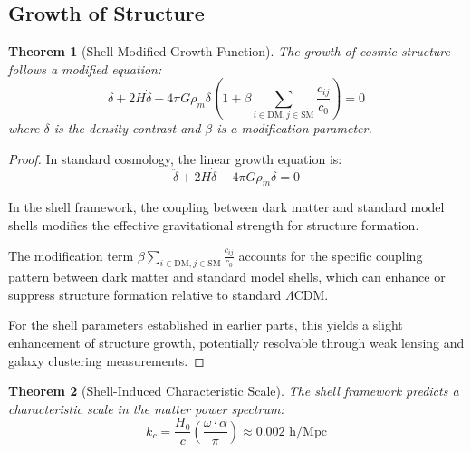 \documentclass[12pt,a4paper]{article}
\newtheorem{theorem}{Theorem}[section]
\begin{document}
\subsection{Growth of Structure}
\label{subsec:growth-structure}

\begin{theorem}[Shell-Modified Growth Function]
\label{thm:growth-function}
The growth of cosmic structure follows a modified equation:
\begin{equation}
\ddot{\delta} + 2H\dot{\delta} - 4\pi G \rho_m \delta \left(1 + \beta \sum_{i \in \text{DM}, j \in \text{SM}} \frac{c_{ij}}{c_0}\right) = 0
\end{equation}
where $\delta$ is the density contrast and $\beta$ is a modification parameter.
\end{theorem}

\begin{proof}
In standard cosmology, the linear growth equation is:
\begin{equation}
\ddot{\delta} + 2H\dot{\delta} - 4\pi G \rho_m \delta = 0
\end{equation}

In the shell framework, the coupling between dark matter and standard model shells modifies the effective gravitational strength for structure formation.

The modification term $\beta \sum_{i \in \text{DM}, j \in \text{SM}} \frac{c_{ij}}{c_0}$ accounts for the specific coupling pattern between dark matter and standard model shells, which can enhance or suppress structure formation relative to standard $\Lambda$CDM.

For the shell parameters established in earlier parts, this yields a slight enhancement of structure growth, potentially resolvable through weak lensing and galaxy clustering measurements.
\end{proof}

\begin{theorem}[Shell-Induced Characteristic Scale]
\label{thm:characteristic-scale}
The shell framework predicts a characteristic scale in the matter power spectrum:
\begin{equation}
k_c = \frac{H_0}{c} \left(\frac{\omega \cdot \alpha}{\pi}\right) \approx 0.002 \text{ h/Mpc}
\end{equation}
\end{theorem}
\end{document}
